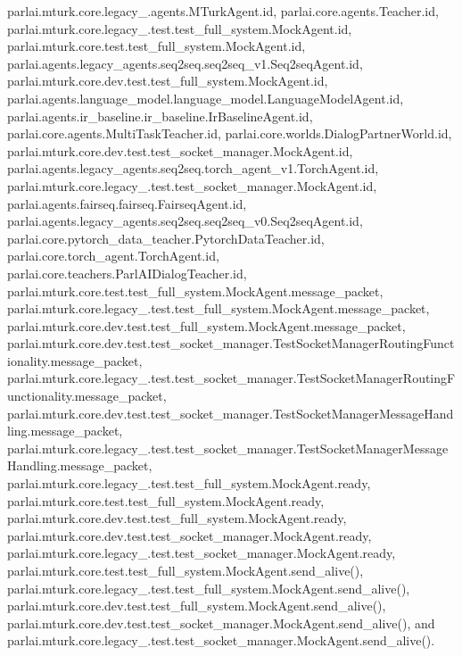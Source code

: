 parlai.\+mturk.\+core.\+legacy\+\_.\+agents.\+M\+Turk\+Agent.\+id, parlai.\+core.\+agents.\+Teacher.\+id, parlai.\+mturk.\+core.\+legacy\+\_.\+test.\+test\+\_\+full\+\_\+system.\+Mock\+Agent.\+id, parlai.\+mturk.\+core.\+test.\+test\+\_\+full\+\_\+system.\+Mock\+Agent.\+id, parlai.\+agents.\+legacy\+\_\+agents.\+seq2seq.\+seq2seq\+\_\+v1.\+Seq2seq\+Agent.\+id, parlai.\+mturk.\+core.\+dev.\+test.\+test\+\_\+full\+\_\+system.\+Mock\+Agent.\+id, parlai.\+agents.\+language\+\_\+model.\+language\+\_\+model.\+Language\+Model\+Agent.\+id, parlai.\+agents.\+ir\+\_\+baseline.\+ir\+\_\+baseline.\+Ir\+Baseline\+Agent.\+id, parlai.\+core.\+agents.\+Multi\+Task\+Teacher.\+id, parlai.\+core.\+worlds.\+Dialog\+Partner\+World.\+id, parlai.\+mturk.\+core.\+dev.\+test.\+test\+\_\+socket\+\_\+manager.\+Mock\+Agent.\+id, parlai.\+agents.\+legacy\+\_\+agents.\+seq2seq.\+torch\+\_\+agent\+\_\+v1.\+Torch\+Agent.\+id, parlai.\+mturk.\+core.\+legacy\+\_.\+test.\+test\+\_\+socket\+\_\+manager.\+Mock\+Agent.\+id, parlai.\+agents.\+fairseq.\+fairseq.\+Fairseq\+Agent.\+id, parlai.\+agents.\+legacy\+\_\+agents.\+seq2seq.\+seq2seq\+\_\+v0.\+Seq2seq\+Agent.\+id, parlai.\+core.\+pytorch\+\_\+data\+\_\+teacher.\+Pytorch\+Data\+Teacher.\+id, parlai.\+core.\+torch\+\_\+agent.\+Torch\+Agent.\+id, parlai.\+core.\+teachers.\+Parl\+A\+I\+Dialog\+Teacher.\+id, parlai.\+mturk.\+core.\+test.\+test\+\_\+full\+\_\+system.\+Mock\+Agent.\+message\+\_\+packet, parlai.\+mturk.\+core.\+legacy\+\_.\+test.\+test\+\_\+full\+\_\+system.\+Mock\+Agent.\+message\+\_\+packet, parlai.\+mturk.\+core.\+dev.\+test.\+test\+\_\+full\+\_\+system.\+Mock\+Agent.\+message\+\_\+packet, parlai.\+mturk.\+core.\+dev.\+test.\+test\+\_\+socket\+\_\+manager.\+Test\+Socket\+Manager\+Routing\+Functionality.\+message\+\_\+packet, parlai.\+mturk.\+core.\+legacy\+\_.\+test.\+test\+\_\+socket\+\_\+manager.\+Test\+Socket\+Manager\+Routing\+Functionality.\+message\+\_\+packet, parlai.\+mturk.\+core.\+dev.\+test.\+test\+\_\+socket\+\_\+manager.\+Test\+Socket\+Manager\+Message\+Handling.\+message\+\_\+packet, parlai.\+mturk.\+core.\+legacy\+\_.\+test.\+test\+\_\+socket\+\_\+manager.\+Test\+Socket\+Manager\+Message\+Handling.\+message\+\_\+packet, parlai.\+mturk.\+core.\+legacy\+\_.\+test.\+test\+\_\+full\+\_\+system.\+Mock\+Agent.\+ready, parlai.\+mturk.\+core.\+test.\+test\+\_\+full\+\_\+system.\+Mock\+Agent.\+ready, parlai.\+mturk.\+core.\+dev.\+test.\+test\+\_\+full\+\_\+system.\+Mock\+Agent.\+ready, parlai.\+mturk.\+core.\+dev.\+test.\+test\+\_\+socket\+\_\+manager.\+Mock\+Agent.\+ready, parlai.\+mturk.\+core.\+legacy\+\_.\+test.\+test\+\_\+socket\+\_\+manager.\+Mock\+Agent.\+ready, parlai.\+mturk.\+core.\+test.\+test\+\_\+full\+\_\+system.\+Mock\+Agent.\+send\+\_\+alive(), parlai.\+mturk.\+core.\+legacy\+\_.\+test.\+test\+\_\+full\+\_\+system.\+Mock\+Agent.\+send\+\_\+alive(), parlai.\+mturk.\+core.\+dev.\+test.\+test\+\_\+full\+\_\+system.\+Mock\+Agent.\+send\+\_\+alive(), parlai.\+mturk.\+core.\+dev.\+test.\+test\+\_\+socket\+\_\+manager.\+Mock\+Agent.\+send\+\_\+alive(), and parlai.\+mturk.\+core.\+legacy\+\_.\+test.\+test\+\_\+socket\+\_\+manager.\+Mock\+Agent.\+send\+\_\+alive().



